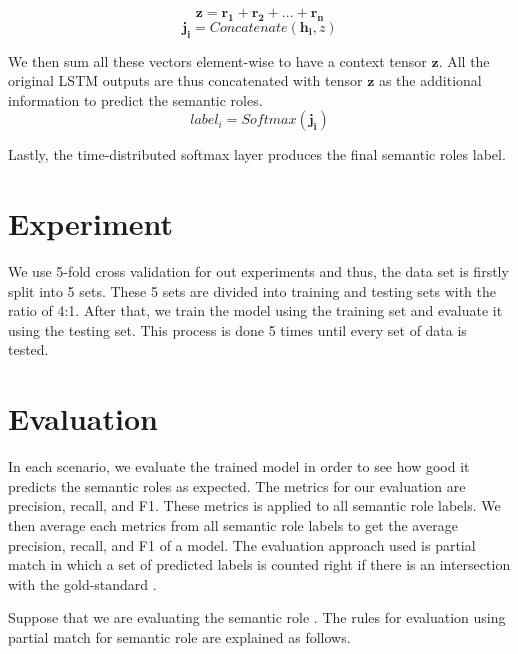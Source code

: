 \begin{equation}
\mathbf{z} = \mathbf{r_{1}} + \mathbf{r_{2}} + ... + \mathbf{r_{n}}
\end{equation}
\begin{equation}
\mathbf{j_{i}} = Concatenate(\mathbf{h_{i}}, z)
\end{equation}

We then sum all these vectors element-wise to have a context tensor $\mathbf{z}$. 
All the original LSTM outputs are thus concatenated with tensor $\mathbf{z}$ as the additional information to predict the semantic roles.
\begin{equation}
label_{i} = Softmax(\mathbf{j_{i}})
\end{equation}

Lastly, the time-distributed softmax layer produces the final semantic roles label.

\section{Experiment}
We use 5-fold cross validation for out experiments and thus, the data set is firstly split into 5 sets. These 5 sets are divided into training and testing sets with the ratio of 4:1. After that, we train the model using the training set and evaluate it using the testing set. This process is done 5 times until every set of data is tested.

\section{Evaluation}
In each scenario, we evaluate the trained model in order to see how good it predicts the semantic roles as expected. The metrics for our evaluation are precision, recall, and F1. These metrics is applied to all semantic role labels. We then average each metrics from all semantic role labels to get the average precision, recall, and F1 of a model. The evaluation approach used is partial match in which a set of predicted labels is counted right if there is an intersection with the gold-standard \citep{seki2003probabilistic}. 

Suppose that we are evaluating the semantic role \patient. The rules for evaluation using partial match for semantic role \patient are explained as follows.

